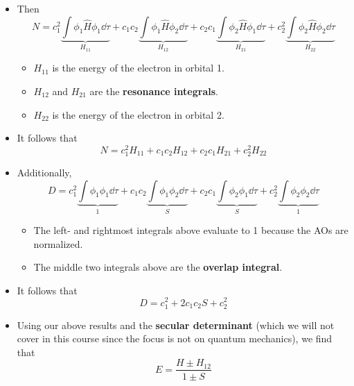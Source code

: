 \documentclass[../notes.tex]{subfiles}
\begin{document}
\begin{itemize}
\begin{itemize}
        \item Then
        \begin{equation*}
            N = c_1^2\underbrace{\int\phi_1\hat{H}\phi_1\dd\tau}_{H_{11}}+c_1c_2\underbrace{\int\phi_1\hat{H}\phi_2\dd\tau}_{H_{12}}+c_2c_1\underbrace{\int\phi_2\hat{H}\phi_1\dd\tau}_{H_{21}}+c_2^2\underbrace{\int\phi_2\hat{H}\phi_2\dd\tau}_{H_{22}}
        \end{equation*}
        \begin{itemize}
            \item $H_{11}$ is the energy of the electron in orbital 1.
            \item $H_{12}$ and $H_{21}$ are the \textbf{resonance integrals}.
            \item $H_{22}$ is the energy of the electron in orbital 2.
        \end{itemize}
        \item It follows that
        \begin{equation*}
            N = c_1^2H_{11}+c_1c_2H_{12}+c_2c_1H_{21}+c_2^2H_{22}
        \end{equation*}
        \item Additionally,
        \begin{equation*}
            D = c_1^2\underbrace{\int\phi_1\phi_1\dd\tau}_1+c_1c_2\underbrace{\int\phi_1\phi_2\dd\tau}_S+c_2c_1\underbrace{\int\phi_2\phi_1\dd\tau}_S+c_2^2\underbrace{\int\phi_2\phi_2\dd\tau}_1
        \end{equation*}
        \begin{itemize}
            \item The left- and rightmost integrals above evaluate to 1 because the AOs are normalized.
            \item The middle two integrals above are the \textbf{overlap integral}.
        \end{itemize}
        \item It follows that
        \begin{equation*}
            D = c_1^2+2c_1c_2S+c_2^2
        \end{equation*}
        \item Using our above results and the \textbf{secular determinant} (which we will not cover in this course since the focus is not on quantum mechanics), we find that
        \begin{equation*}
            E = \frac{H\pm H_{12}}{1\pm S}
        \end{equation*}
    \end{itemize}

\end{itemize}
\end{document}
